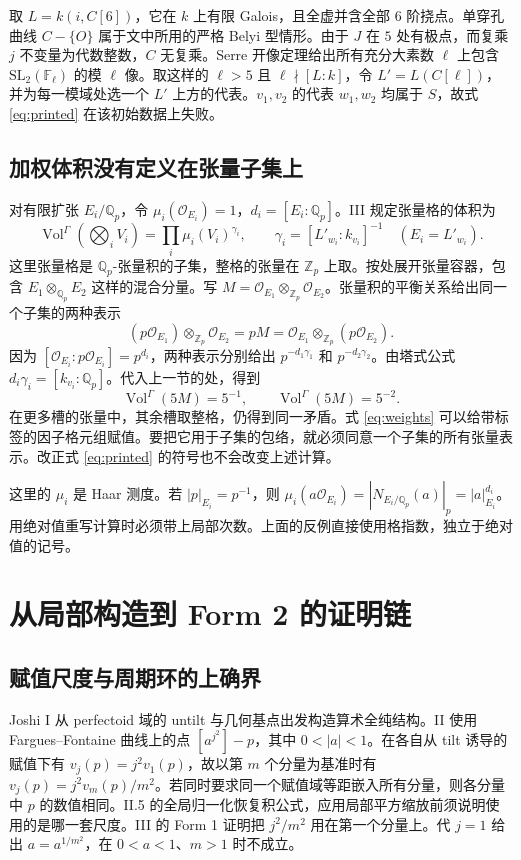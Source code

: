 \documentclass[UTF8,fontset=none,zihao=-4,a4paper]{ctexart}
\newcommand{\OO}{\mathcal O}
\newcommand{\Q}{\mathbb Q}
\newcommand{\Z}{\mathbb Z}
\newcommand{\Vol}{\operatorname{Vol}}
\begin{document}
取 \(L=k(i,C[6])\)，它在 \(k\) 上有限 Galois，且全虚并含全部 \(6\) 阶挠点。单穿孔曲线 \(C-\{O\}\) 属于文中所用的严格 Belyi 型情形。由于 \(J\) 在 \(5\) 处有极点，而复乘 \(j\) 不变量为代数整数，\(C\) 无复乘。Serre 开像定理给出所有充分大素数 \(\ell\) 上包含 \(\mathrm{SL}_2(\mathbb F_\ell)\) 的模 \(\ell\) 像。取这样的 \(\ell>5\) 且 \(\ell\nmid[L:k]\)，令 \(L'=L(C[\ell])\)，并为每一模域处选一个 \(L'\) 上方的代表。\(v_1,v_2\) 的代表 \(w_1,w_2\) 均属于 \(S\)，故式 \eqref{eq:printed} 在该初始数据上失败。\cite[III 的初始数据段]{jiii}\cite{jii,serre}

\subsection{加权体积没有定义在张量子集上}
对有限扩张 \(E_i/\Q_p\)，令 \(\mu_i(\OO_{E_i})=1\)，\(d_i=[E_i:\Q_p]\)。III 规定张量格的体积为
\begin{equation}
 \Vol^\Gamma\left(\bigotimes_i V_i\right)=\prod_i\mu_i(V_i)^{\gamma_i},
 \qquad \gamma_i=[L'_{w_i}:k_{v_i}]^{-1} \quad(E_i=L'_{w_i}).
 \label{eq:weights}
\end{equation}
这里张量格是 \(\Q_p\)-张量积的子集，整格的张量在 \(\Z_p\) 上取。按处展开张量容器，包含 \(E_1\otimes_{\Q_p}E_2\) 这样的混合分量。写 \(M=\OO_{E_1}\otimes_{\Z_p}\OO_{E_2}\)。张量积的平衡关系给出同一个子集的两种表示
\[
 (p\OO_{E_1})\otimes_{\Z_p}\OO_{E_2}=pM
 =\OO_{E_1}\otimes_{\Z_p}(p\OO_{E_2}).
\]
因为 \([\OO_{E_i}:p\OO_{E_i}]=p^{d_i}\)，两种表示分别给出 \(p^{-d_1\gamma_1}\) 和 \(p^{-d_2\gamma_2}\)。由塔式公式 \(d_i\gamma_i=[k_{v_i}:\Q_p]\)。代入上一节的处，得到
\[
 \Vol^\Gamma(5M)=5^{-1},\qquad \Vol^\Gamma(5M)=5^{-2}.
\]
在更多槽的张量中，其余槽取整格，仍得到同一矛盾。式 \eqref{eq:weights} 可以给带标签的因子格元组赋值。要把它用于子集的包络，就必须同意一个子集的所有张量表示。改正式 \eqref{eq:printed} 的符号也不会改变上述计算。\cite[III 的带权体积定义及 Form 2]{jiii}

这里的 \(\mu_i\) 是 Haar 测度。若 \(|p|_{E_i}=p^{-1}\)，则 \(\mu_i(a\OO_{E_i})=|N_{E_i/\Q_p}(a)|_p=|a|_{E_i}^{d_i}\)。用绝对值重写计算时必须带上局部次数。上面的反例直接使用格指数，独立于绝对值的记号。

\section{从局部构造到 Form 2 的证明链}
\subsection{赋值尺度与周期环的上确界}
Joshi I 从 perfectoid 域的 untilt 与几何基点出发构造算术全纯结构。II 使用 Fargues--Fontaine 曲线上的点 \([a^{j^2}]-p\)，其中 \(0<|a|<1\)。在各自从 tilt 诱导的赋值下有 \(v_j(p)=j^2v_1(p)\)，故以第 \(m\) 个分量为基准时有 \(v_j(p)=j^2v_m(p)/m^2\)。若同时要求同一个赋值域等距嵌入所有分量，则各分量中 \(p\) 的数值相同。II.5 的全局归一化恢复积公式，应用局部平方缩放前须说明使用的是哪一套尺度。III 的 Form 1 证明把 \(j^2/m^2\) 用在第一个分量上。代 \(j=1\) 给出 \(a=a^{1/m^2}\)，在 \(0<a<1\)、\(m>1\) 时不成立。\cite{ji,jii,jhalf,jiii}
\end{document}
